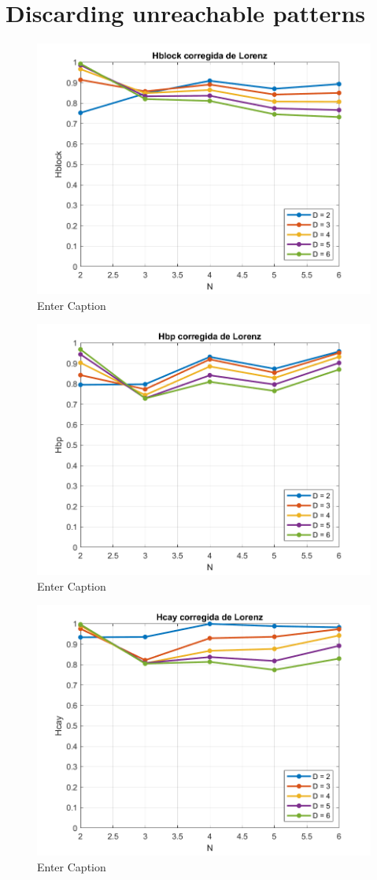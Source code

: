 \documentclass[twocolumn]{article}
\begin{document}
\section{Discarding unreachable patterns}

\begin{figure}
    \centering
    \includegraphics[width=.5\textwidth]{blockHlorenzCorreg.png}
    \caption{Enter Caption}
    \label{fig:enter-label}
\end{figure}

\begin{figure}
    \centering
    \includegraphics[width=.5\textwidth]{bpHlorenzCorreg.png}
    \caption{Enter Caption}
    \label{fig:enter-label}
\end{figure}

\begin{figure}
    \centering
    \includegraphics[width=.5\textwidth]{cayHlorenzCorreg.png}
    \caption{Enter Caption}
    \label{fig:enter-label}
\end{figure}




\end{document}
